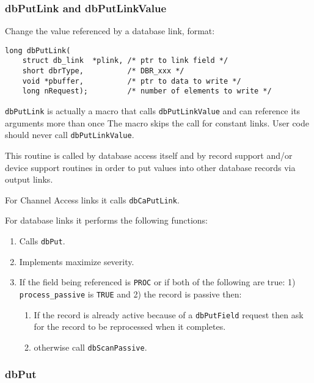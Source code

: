 \subsubsection{dbPutLink and dbPutLinkValue}

Change the value referenced by a database link, format:

\begin{verbatim}
long dbPutLink(
    struct db_link  *plink, /* ptr to link field */
    short dbrType,          /* DBR_xxx */
    void *pbuffer,          /* ptr to data to write */
    long nRequest);         /* number of elements to write */
\end{verbatim}

\verb|dbPutLink| is actually a macro that calls \verb|dbPutLinkValue| and can reference its arguments more than once The 
macro skips the call for constant links. User code should never call \verb|dbPutLinkValue|.

This routine is called by database access itself and by record support and/or device support routines in order to put values 
into other database records via output links.

For Channel Access links it calls \verb|dbCaPutLink|.

For database links it performs the following functions:

\begin{enumerate}
\item Calls \verb|dbPut|.

\item Implements maximize severity.

\item If the field being referenced is \verb|PROC| or if both of the following are true: 1) \verb|process_passive| is \verb|TRUE| and 2) the record is passive then:

\begin{enumerate}

\item If the record is already active because of a \verb|dbPutField| request then ask for the record to be reprocessed when it completes.

\item otherwise call \verb|dbScanPassive|.

\end{enumerate}
\end{enumerate}

\subsubsection{dbPut}

